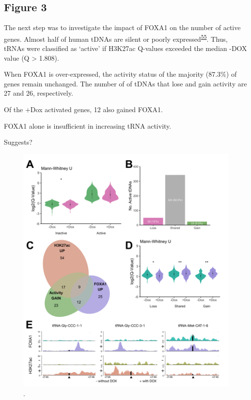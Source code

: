 \documentclass[
  11pt,
]{article}
\begin{document}
\hypertarget{figure-3}{%
\subsection{Figure 3}\label{figure-3}}

The next step was to investigate the impact of FOXA1 on the number of active genes.
Almost half of human tDNAs are silent or poorly expressed\textsuperscript{\protect\hyperlink{ref-Torres2019}{55}}.
Thus, tRNAs were classified as `active' if H3K27ac Q-values exceeded the median -DOX value (Q \textgreater{} 1.808).

When FOXA1 is over-expressed, the activity status of the majority (87.3\%) of genes remain unchanged.
The number of of tDNAs that lose and gain activity are 27 and 26, respectively.

Of the +Dox activated genes, 12 also gained FOXA1.

FOXA1 alone is insufficient in increasing tRNA activity.

Suggests?

\begin{figure}[H]
\includegraphics[width=1\linewidth]{../images/results-03} \caption{.}\label{fig:results-3}
\end{figure}
\end{document}
